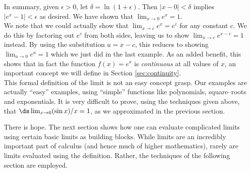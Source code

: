 {In summary, given $\epsilon > 0$, let $\delta = \ln(1+\epsilon)$. Then $|x - 0| < \delta$ implies $|e^x - 1|< \epsilon$ as desired.  We have shown that $\displaystyle \lim_{x\rightarrow 0} e^x = 1 $.
}\\

We note that we could actually show that $\lim_{x\rightarrow c} e^x = e^c $ for any constant $c$.  We do this by factoring out $e^c$ from both sides, leaving us to show $\lim_{x\rightarrow c} e^{x-c} = 1 $ instead.  By using the substitution $u=x-c$, this reduces to showing $\lim_{u\rightarrow 0} e^u = 1 $ which we just did in the last example.  As an added benefit, this shows that in fact the function $f(x)=e^x$ is \textit{continuous} at all values of $x$, an important concept we will define in Section \ref{sec:continuity}.\\

This formal definition of the limit is not an easy concept grasp. Our examples are actually ``easy'' examples, using ``simple'' functions like polynomials, square--roots and exponentials. It is very difficult to prove, using the techniques given above, that $\ds \lim_{x\to 0}(\sin x)/x = 1$, as we approximated in the previous section.

There is hope. The next section shows how one can evaluate complicated limits using certain basic limits as building blocks. While limits are an incredibly important part of calculus (and hence much of higher mathematics), rarely are limits evaluated using the definition. Rather, the techniques of the following section are employed.



{}
